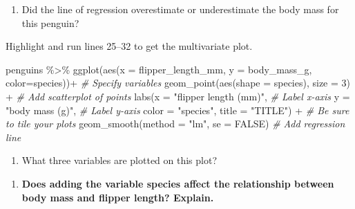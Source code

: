 \documentclass[
]{report}
\newenvironment{Shaded}{\begin{snugshade}}{\end{snugshade}}
\newcommand{\AttributeTok}[1]{\textcolor[rgb]{0.77,0.63,0.00}{#1}}
\newcommand{\CommentTok}[1]{\textcolor[rgb]{0.56,0.35,0.01}{\textit{#1}}}
\newcommand{\ConstantTok}[1]{\textcolor[rgb]{0.00,0.00,0.00}{#1}}
\newcommand{\DecValTok}[1]{\textcolor[rgb]{0.00,0.00,0.81}{#1}}
\newcommand{\FunctionTok}[1]{\textcolor[rgb]{0.00,0.00,0.00}{#1}}
\newcommand{\NormalTok}[1]{#1}
\newcommand{\SpecialCharTok}[1]{\textcolor[rgb]{0.00,0.00,0.00}{#1}}
\newcommand{\StringTok}[1]{\textcolor[rgb]{0.31,0.60,0.02}{#1}}
\providecommand{\tightlist}{%
  \setlength{\itemsep}{0pt}\setlength{\parskip}{0pt}}
\begin{document}
\vspace{.8in}

\begin{enumerate}
\def\labelenumi{\arabic{enumi}.}
\setcounter{enumi}{8}
\tightlist
\item
  Did the line of regression overestimate or underestimate the body mass for this penguin?
\end{enumerate}

\vspace{0.5in}

Highlight and run lines 25--32 to get the multivariate plot.

\begin{Shaded}
\begin{Highlighting}[]
\NormalTok{penguins }\SpecialCharTok{\%\textgreater{}\%}
  \FunctionTok{ggplot}\NormalTok{(}\FunctionTok{aes}\NormalTok{(}\AttributeTok{x =}\NormalTok{ flipper\_length\_mm, }\AttributeTok{y =}\NormalTok{ body\_mass\_g, }\AttributeTok{color=}\NormalTok{species))}\SpecialCharTok{+}  \CommentTok{\# Specify variables}
  \FunctionTok{geom\_point}\NormalTok{(}\FunctionTok{aes}\NormalTok{(}\AttributeTok{shape =}\NormalTok{ species), }\AttributeTok{size =} \DecValTok{3}\NormalTok{) }\SpecialCharTok{+}  \CommentTok{\# Add scatterplot of points}
  \FunctionTok{labs}\NormalTok{(}\AttributeTok{x =} \StringTok{"flipper length (mm)"}\NormalTok{,  }\CommentTok{\# Label x{-}axis}
       \AttributeTok{y =} \StringTok{"body mass (g)"}\NormalTok{,  }\CommentTok{\# Label y{-}axis}
       \AttributeTok{color =} \StringTok{"species"}\NormalTok{,}
       \AttributeTok{title =} \StringTok{"TITLE"}\NormalTok{) }\SpecialCharTok{+} \CommentTok{\# Be sure to tile your plots}
  \FunctionTok{geom\_smooth}\NormalTok{(}\AttributeTok{method =} \StringTok{"lm"}\NormalTok{, }\AttributeTok{se =} \ConstantTok{FALSE}\NormalTok{)  }\CommentTok{\# Add regression line}
\end{Highlighting}
\end{Shaded}

\begin{enumerate}
\def\labelenumi{\arabic{enumi}.}
\setcounter{enumi}{9}
\tightlist
\item
  What three variables are plotted on this plot?
\end{enumerate}

\vspace{0.3in}

\begin{enumerate}
\def\labelenumi{\arabic{enumi}.}
\setcounter{enumi}{10}
\tightlist
\item
  \textbf{Does adding the variable species affect the relationship between body mass and flipper length? Explain.}
\end{enumerate}
\end{document}
